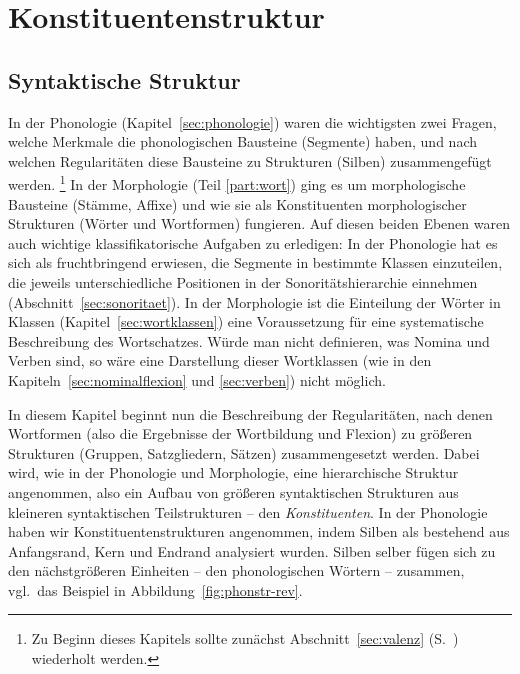 \chapter{Konstituentenstruktur}


\newcommand{\COny}[2][-]{%
\POS[]+(0,-3);\POS[]+(0,-6)**\dir{#1} \POS[]+(0,-6);\POS[#2]+(0,-6)**\dir{#1}
\POS[#2]+(0,-6) \ar@{#1>}[#2]+(0,-3)}

\label{sec:konstituentenstruktur}

\section{Syntaktische Struktur}

\label{sec:syntaktischestruktur}

In der Phonologie (Kapitel~\ref{sec:phonologie}) waren die wichtigsten zwei Fragen, welche Merkmale die phonologischen Bausteine (Segmente) haben, und nach welchen Regularitäten diese Bausteine zu Strukturen (\zB Silben) zusammengefügt werden.%
\footnote{Zu Beginn dieses Kapitels sollte zunächst Abschnitt~\ref{sec:valenz} (S.~\pageref{sec:valenz}) wiederholt werden.}
In der Morphologie (Teil \ref{part:wort}) ging es um morphologische Bausteine (Stämme, Affixe) und wie sie als Konstituenten morphologischer Strukturen (Wörter und Wortformen) fungieren.
Auf diesen beiden Ebenen waren auch wichtige klassifikatorische Aufgaben zu erledigen:
In der Phonologie hat es sich \zB als fruchtbringend erwiesen, die Segmente in bestimmte Klassen einzuteilen, die jeweils unterschiedliche Positionen in der Sonoritätshierarchie einnehmen (Abschnitt~\ref{sec:sonoritaet}).
In der Morphologie ist die Einteilung der Wörter in Klassen (Kapitel~\ref{sec:wortklassen}) eine Voraussetzung für eine systematische Beschreibung des Wortschatzes.
Würde man nicht definieren, was \zB Nomina und Verben sind, so wäre eine Darstellung dieser Wortklassen (wie in den Kapiteln~\ref{sec:nominalflexion} und \ref{sec:verben}) nicht möglich.

In diesem Kapitel beginnt nun die Beschreibung der Regularitäten, nach denen Wortformen (also die Ergebnisse der Wortbildung und Flexion) zu größeren Strukturen (Gruppen, Satzgliedern, Sätzen) zusammengesetzt werden.
Dabei wird, wie in der Phonologie und Morphologie, eine hierarchische Struktur angenommen, also ein Aufbau von größeren syntaktischen Strukturen aus kleineren syntaktischen Teilstrukturen -- den \textit{Konstituenten}.
In der Phonologie haben wir Konstituentenstrukturen angenommen, indem \zB Silben als bestehend aus Anfangsrand, Kern und Endrand analysiert wurden.
Silben selber fügen sich zu den nächstgrößeren Einheiten -- den phonologischen Wörtern -- zusammen, vgl.\ das Beispiel in Abbildung~\ref{fig:phonstr-rev}.

